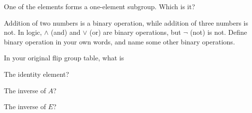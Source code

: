 \documentclass[../gatm_answers.tex]{subfiles}
\begin{document}
\begin{outer_problem}
\item One of the elements forms a one-element subgroup. Which is it?
\end{outer_problem}

\begin{outer_problem}
\item Addition of two numbers is a binary operation, while addition of three numbers is not. In logic, $\land$ (and) and $\lor$ (or) are binary operations, but $\lnot$ (not) is not. Define binary operation in your own words, and name some other binary operations.
\end{outer_problem}

\begin{outer_problem}
\item In your original flip group table, what is
\end{outer_problem}

\begin{inner_problem}[start=1]
\item The identity element?
\end{inner_problem}

\begin{inner_problem}
\item The inverse of $A$?
\end{inner_problem}

\begin{inner_problem}
\item The inverse of $E$?
\end{inner_problem}
\end{document}

